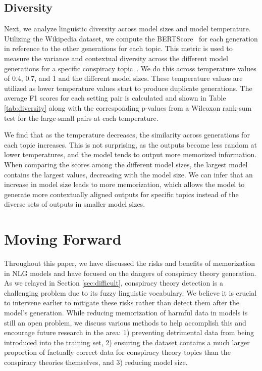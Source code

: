 \documentclass[11pt,a4paper]{article}
\begin{document}
\subsection{Diversity}
Next, we analyze linguistic diversity across model sizes and model temperature. Utilizing the Wikipedia dataset, we compute the BERTScore~\cite{bert-score} for each generation in reference to the other generations for each topic. This metric is used to measure the variance and contextual diversity across the different model generations for a specific conspiracy topic~\cite{zhu2020understanding}. We do this across temperature values of 0.4, 0.7, and 1 and the different model sizes. These temperature values are utilized as lower temperature values start to produce duplicate generations. The average F1 scores for each setting pair is calculated and shown in Table \ref{tab:diversity} along with the corresponding p-values from a Wilcoxon rank-sum test for the large-small pairs at each temperature.  

We find that as the temperature decreases, the similarity across generations for each topic increases. This is not surprising, as the outputs become less random at lower temperatures, and the model tends to output more memorized information. When comparing the scores among the different model sizes, the largest model contains the largest values, decreasing with the model size. We can infer that an increase in model size leads to more memorization, which allows the model to generate more contextually aligned outputs for specific topics instead of the diverse sets of outputs in smaller model sizes.





\section{Moving Forward}
Throughout this paper, we have discussed the risks and benefits of memorization in NLG models and have focused on the dangers of conspiracy theory generation. As we relayed in Section \ref{sec:difficult}, conspiracy theory detection is a challenging problem due to its fuzzy linguistic vocabulary. We believe it is crucial to intervene earlier to mitigate these risks rather than detect them after the model's generation. While reducing memorization of harmful data in models is still an open problem, we discuss various methods to help accomplish this and encourage future research in the area: 1) preventing detrimental data from being introduced into the training set, 2) ensuring the dataset contains a much larger proportion of factually correct data for conspiracy theory topics than the conspiracy theories themselves, and 3) reducing model size.
\end{document}
